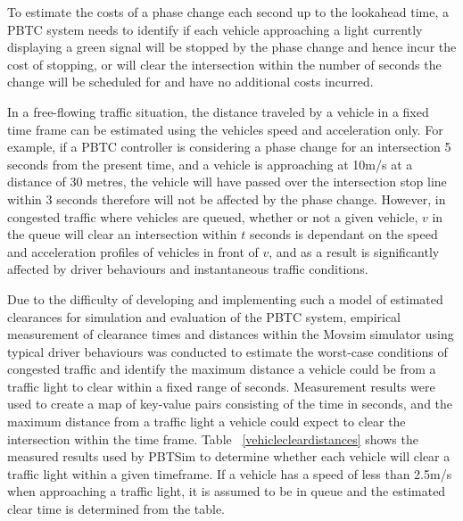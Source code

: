 To estimate the costs of a phase change each second up to the lookahead time, a PBTC system needs to identify if each vehicle approaching a light currently displaying a green signal will be stopped by the phase change and hence incur the cost of stopping, or will clear the intersection within the number of seconds the change will be scheduled for and have no additional costs incurred. 

In a free-flowing traffic situation, the distance traveled by a vehicle in a fixed time frame can be estimated using the vehicles speed and acceleration only. For example, if a PBTC controller is considering a phase change for an intersection 5 seconds from the present time, and a vehicle is approaching at 10m/s at a distance of 30 metres, the vehicle will have passed over the intersection stop line within 3 seconds therefore will not be affected by the phase change.  However, in congested traffic where vehicles are queued, whether or not a given vehicle, $v$ in the queue will clear an intersection within $t$ seconds is dependant on the speed and acceleration profiles of vehicles in front of $v$, and as a result is significantly affected by driver behaviours and instantaneous traffic conditions. 

Due to the difficulty of developing and implementing such a model of estimated clearances for simulation and evaluation of the PBTC system, empirical measurement of clearance times and distances within the Movsim simulator using typical driver behaviours was conducted to estimate the worst-case conditions of congested traffic and identify the maximum distance a vehicle could be from a traffic light to clear within a fixed range of seconds. Measurement results were used to create a map of key-value pairs consisting of the time in seconds, and the maximum distance from a traffic light a vehicle could expect to clear the intersection within the time frame. Table ~\ref{vehiclecleardistances} shows the measured results used by PBTSim to determine whether each vehicle will clear a traffic light within a given timeframe. If a vehicle has a speed of less than 2.5m/s when approaching a traffic light, it is assumed to be in queue and the estimated clear time is determined from the table.

